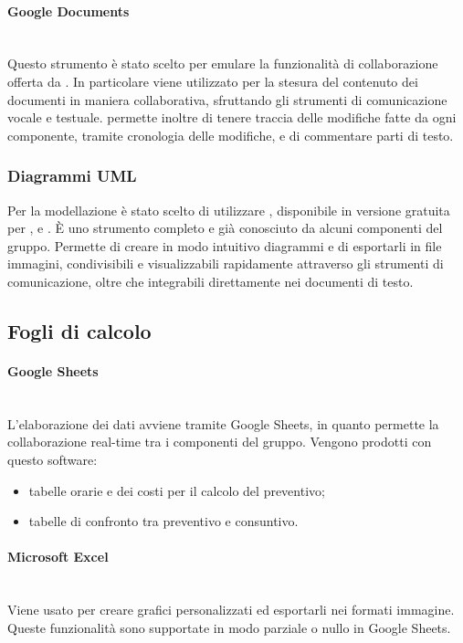 \paragraph{Google Documents}\mbox{}\\
Questo strumento è stato scelto per emulare la funzionalità di collaborazione offerta da . In particolare viene utilizzato per la stesura del contenuto dei documenti in maniera collaborativa, sfruttando gli strumenti di comunicazione vocale e testuale.  permette inoltre di tenere traccia delle modifiche fatte da ogni componente, tramite cronologia delle modifiche, e di commentare parti di testo. 

\subsubsection{Diagrammi UML}
Per la modellazione  è stato scelto di utilizzare \textbf{}, disponibile in versione gratuita per ,  e . \`{E} uno strumento completo e già conosciuto da alcuni componenti del gruppo. Permette di creare in modo intuitivo diagrammi  e di esportarli in file immagini, condivisibili e visualizzabili rapidamente attraverso gli strumenti di comunicazione, oltre che integrabili direttamente nei documenti di testo.

\subsection{Fogli di calcolo} \label{sec:fogli_di_calcolo}
\paragraph{Google Sheets}\mbox{}\\
L'elaborazione dei dati avviene tramite Google Sheets, in quanto permette la collaborazione real-time tra i componenti del gruppo. Vengono prodotti con questo software:
	\begin{itemize}
	\item tabelle orarie e dei costi per il calcolo del preventivo;
	\item tabelle di confronto tra preventivo e consuntivo.
	\end{itemize}

\paragraph{Microsoft Excel} \mbox{}\\
Viene usato per creare grafici personalizzati ed esportarli nei formati immagine. Queste funzionalità sono supportate in modo parziale o nullo in Google Sheets. 

